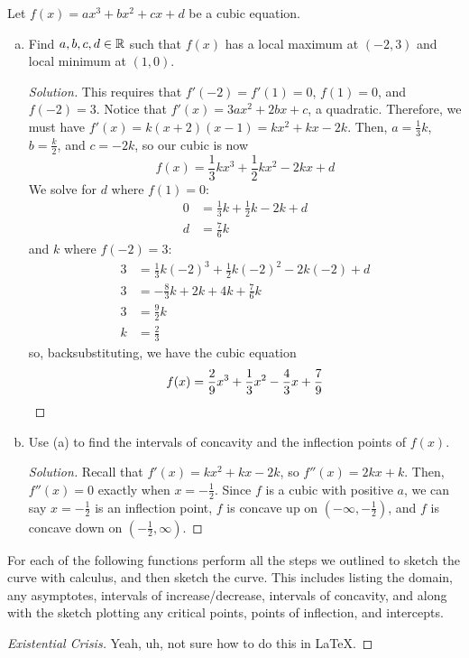 \question Let $f(x)=ax^3+bx^2+cx+d$ be a cubic equation.
\begin{enumerate}[(a)]
  \item Find $a,b,c,d\in\mathbb{R}$ such that $f(x)$ has a local maximum at $(-2,3)$ and local minimum at $(1,0)$.
        \begin{proof}[Solution]
          This requires that $f'(-2)=f'(1)=0$, $f(1)=0$, and $f(-2)=3$.
          Notice that $f'(x) = 3ax^2+2bx+c$, a quadratic.
          Therefore, we must have $f'(x)=k(x+2)(x-1)=kx^2+kx-2k$.
          Then, $a=\frac13k$, $b=\frac{k}{2}$, and $c=-2k$, so our cubic is now
          \[ f(x) = \frac13kx^3 + \frac12kx^2 - 2kx + d \]
          We solve for $d$ where $f(1)=0$:
          \begin{align*}
            0 & = \frac13k + \frac12k - 2k + d \\
            d & = \frac76k
          \end{align*}
          and $k$ where $f(-2)=3$:
          \begin{align*}
            3 & = \frac13k(-2)^3 + \frac12k(-2)^2 - 2k(-2) + d \\
            3 & = -\frac83k + 2k + 4k + \frac76k               \\
            3 & = \frac92k                                     \\
            k & = \frac23
          \end{align*}
          so, backsubstituting, we have the cubic equation
          \[ f(x) = \frac{2}{9}x^3 + \frac{1}{3}x^2 - \frac{4}{3}x + \frac{7}{9} \qedhere \]
        \end{proof}
  \item Use (a) to find the intervals of concavity and the inflection points of $f(x)$.
        \begin{proof}[Solution]
          Recall that $f'(x)=kx^2+kx-2k$, so $f''(x)=2kx+k$.
          Then, $f''(x)=0$ exactly when $x=-\frac12$.
          Since $f$ is a cubic with positive $a$, we can say $x=-\frac12$ is an inflection point,
          $f$ is concave up on $(-\infty,-\frac12)$, and $f$ is concave down on $(-\frac12,\infty)$.
        \end{proof}
\end{enumerate}


\question For each of the following functions perform all the steps we outlined
to sketch the curve with calculus, and then sketch the curve.
This includes listing the domain, any asymptotes, intervals of increase/decrease,
intervals of concavity, and along with the sketch plotting any critical points,
points of inflection, and intercepts.
\begin{proof}[Existential Crisis]
  Yeah, uh, not sure how to do this in \LaTeX.
\end{proof}

